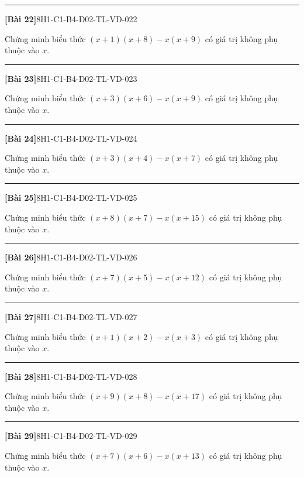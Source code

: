 \documentclass[12pt,a4paper]{article}
\newif\ifloigiai
\newenvironment{cauhoi}[2]{%
  \par\medskip\noindent\rule{\textwidth}{0.4pt}\par\nopagebreak
  \noindent\textbf{[#1]}\hfill{\scriptsize\ttfamily #2}\par\nopagebreak\smallskip}{\par}
\newcommand{\loigiai}[1]{\ifloigiai\par\smallskip\noindent\textit{Lời giải.} #1\par\fi}
\begin{document}
\begin{cauhoi}{Bài 22}{8H1-C1-B4-D02-TL-VD-022}
Chứng minh biểu thức $(x+1)(x+8)-x(x+9)$ có giá trị không phụ thuộc vào $x$.
\loigiai{$(x+1)(x+8)-x(x+9)=x^{2}+x+8x+8-x^{2}-9x=8$. Kết quả là hằng số nên biểu thức không phụ thuộc vào $x$.}
\end{cauhoi}
\begin{cauhoi}{Bài 23}{8H1-C1-B4-D02-TL-VD-023}
Chứng minh biểu thức $(x+3)(x+6)-x(x+9)$ có giá trị không phụ thuộc vào $x$.
\loigiai{$(x+3)(x+6)-x(x+9)=x^{2}+3x+6x+18-x^{2}-9x=18$. Kết quả là hằng số nên biểu thức không phụ thuộc vào $x$.}
\end{cauhoi}
\begin{cauhoi}{Bài 24}{8H1-C1-B4-D02-TL-VD-024}
Chứng minh biểu thức $(x+3)(x+4)-x(x+7)$ có giá trị không phụ thuộc vào $x$.
\loigiai{$(x+3)(x+4)-x(x+7)=x^{2}+3x+4x+12-x^{2}-7x=12$. Kết quả là hằng số nên biểu thức không phụ thuộc vào $x$.}
\end{cauhoi}
\begin{cauhoi}{Bài 25}{8H1-C1-B4-D02-TL-VD-025}
Chứng minh biểu thức $(x+8)(x+7)-x(x+15)$ có giá trị không phụ thuộc vào $x$.
\loigiai{$(x+8)(x+7)-x(x+15)=x^{2}+8x+7x+56-x^{2}-15x=56$. Kết quả là hằng số nên biểu thức không phụ thuộc vào $x$.}
\end{cauhoi}
\begin{cauhoi}{Bài 26}{8H1-C1-B4-D02-TL-VD-026}
Chứng minh biểu thức $(x+7)(x+5)-x(x+12)$ có giá trị không phụ thuộc vào $x$.
\loigiai{$(x+7)(x+5)-x(x+12)=x^{2}+7x+5x+35-x^{2}-12x=35$. Kết quả là hằng số nên biểu thức không phụ thuộc vào $x$.}
\end{cauhoi}
\begin{cauhoi}{Bài 27}{8H1-C1-B4-D02-TL-VD-027}
Chứng minh biểu thức $(x+1)(x+2)-x(x+3)$ có giá trị không phụ thuộc vào $x$.
\loigiai{$(x+1)(x+2)-x(x+3)=x^{2}+x+2x+2-x^{2}-3x=2$. Kết quả là hằng số nên biểu thức không phụ thuộc vào $x$.}
\end{cauhoi}
\begin{cauhoi}{Bài 28}{8H1-C1-B4-D02-TL-VD-028}
Chứng minh biểu thức $(x+9)(x+8)-x(x+17)$ có giá trị không phụ thuộc vào $x$.
\loigiai{$(x+9)(x+8)-x(x+17)=x^{2}+9x+8x+72-x^{2}-17x=72$. Kết quả là hằng số nên biểu thức không phụ thuộc vào $x$.}
\end{cauhoi}
\begin{cauhoi}{Bài 29}{8H1-C1-B4-D02-TL-VD-029}
Chứng minh biểu thức $(x+7)(x+6)-x(x+13)$ có giá trị không phụ thuộc vào $x$.
\loigiai{$(x+7)(x+6)-x(x+13)=x^{2}+7x+6x+42-x^{2}-13x=42$. Kết quả là hằng số nên biểu thức không phụ thuộc vào $x$.}
\end{cauhoi}
\end{document}
